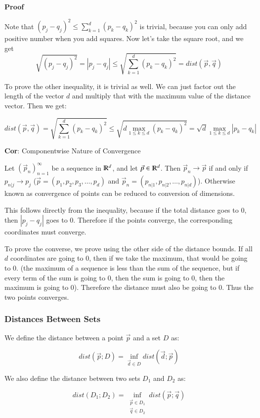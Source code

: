 \documentclass [12 pt, twoside] {book}
\newcommand\+{\text{ }}
\begin{document}
\textbf{Proof}

Note that $(p_j - q_j)^2 \leq \sum_{k = 1}^d (p_k - q_k)^2$ is trivial, because
you can only add positive number when you add squares. Now let's take the square
root, and we get
$$\sqrt{(p_j - q_j)^2} = |p_j - q_j| \leq \sqrt{\sum_{k = 1}^d (p_k - q_k)^2} =
dist(\vec{p}, \vec{q})$$

To prove the other inequality, it is trivial as well. We can just factor out the
length of the vector $d$ and multiply that with the maximum value of the
distance vector. Then we get:

$$dist(\vec{p}, \vec{q}) = \sqrt{\sum_{k = 1}^d (p_k - q_k)^2} \leq \sqrt{d \max_{1 \leq k \leq d} (p_k -
q_k)^2} = \sqrt{d} \max_{1 \leq k \leq
d} |p_k - q_k|$$

\textbf{Cor}: Componentwise Nature of Convergence

Let $(\vec{p}_n)_{n = 1}^\infty$ be a sequence in $\varmathbb{R}^d$, and let
$\vec{p} \in \varmathbb{R}^d$. Then $\vec{p}_n \to \vec{p}$ if and only if
$p_{n|j} \to p_j$ ($\vec{p} = (p_1, p_2, p_3, \dots, p_d)$ and $\vec{p}_n =
(p_{n|1}, p_{n|2}, \dots, p_{n|d})$). Otherwise known as convergence of points
can be reduced to conversion of dimensions.

This follows directly from the inequality, because if the total distance goes to
0, then $|p_j - q_j|$ goes to 0. Therefore if the points converge, the
corresponding coordinates must converge.

To prove the converse, we prove using the other side of the distance bounds. If
all $d$ coordinates are going to 0, then if we take the maximum, that would be
going to 0. (the maximum of a sequence is less than the sum of the sequence, but
if every term of the sum is going to 0, then the sum is going to 0, then the
maximum is going to 0). Therefore the distance must also be going to 0. Thus the two points
converges.

\subsubsection{Distances Between Sets}

We define the distance between a point $\vec{p}$ and a set $D$ as:

$$dist(\vec{p}; D) = \inf_{\vec{d} \in D} dist(\vec{d} ; \vec{p})$$

We also define the distance between two sets $D_1$ and $D_2$ as:

$$dist(D_1 ; D_2) = \inf_{\substack{\vec{p} \in D_1\\\vec{q} \in D_2}}
dist(\vec{p} ; \vec{q})$$
\end{document}
